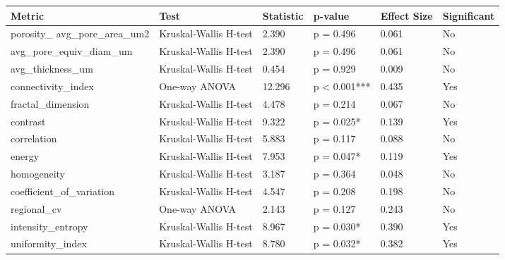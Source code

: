 \begin{tabular}{llllll}
\toprule
Metric & Test & Statistic & p-value & Effect Size & Significant \\
\midrule
porosity_%
avg_pore_area_um2 & Kruskal-Wallis H-test & 2.390 & p = 0.496 & 0.061 & No \\
avg_pore_equiv_diam_um & Kruskal-Wallis H-test & 2.390 & p = 0.496 & 0.061 & No \\
avg_thickness_um & Kruskal-Wallis H-test & 0.454 & p = 0.929 & 0.009 & No \\
connectivity_index & One-way ANOVA & 12.296 & p < 0.001*** & 0.435 & Yes \\
fractal_dimension & Kruskal-Wallis H-test & 4.478 & p = 0.214 & 0.067 & No \\
contrast & Kruskal-Wallis H-test & 9.322 & p = 0.025* & 0.139 & Yes \\
correlation & Kruskal-Wallis H-test & 5.883 & p = 0.117 & 0.088 & No \\
energy & Kruskal-Wallis H-test & 7.953 & p = 0.047* & 0.119 & Yes \\
homogeneity & Kruskal-Wallis H-test & 3.187 & p = 0.364 & 0.048 & No \\
coefficient_of_variation & Kruskal-Wallis H-test & 4.547 & p = 0.208 & 0.198 & No \\
regional_cv & One-way ANOVA & 2.143 & p = 0.127 & 0.243 & No \\
intensity_entropy & Kruskal-Wallis H-test & 8.967 & p = 0.030* & 0.390 & Yes \\
uniformity_index & Kruskal-Wallis H-test & 8.780 & p = 0.032* & 0.382 & Yes \\
\bottomrule
\end{tabular}
